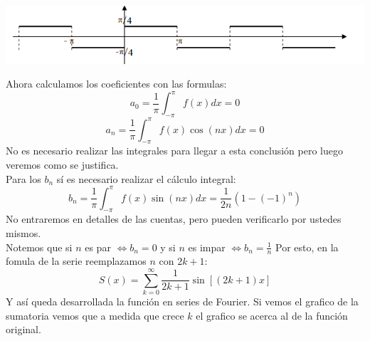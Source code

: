 \documentclass[]{article}
\begin{document}
\includegraphics{../../../Imagenes/Superior/Fourier/Fourier05.PNG}

Ahora calculamos los coeficientes con las formulas: 
$$
a_0 = \frac{1}{\pi} \int_{-\pi}^{\pi}f(x)dx = 0
$$
$$
a_n = \frac{1}{\pi} \int_{-\pi}^{\pi}f(x)\cos(nx)dx = 0
$$
No es necesario realizar las integrales para llegar a esta conclusión pero luego veremos como se justifica.\\
Para los $b_n$ sí es necesario realizar el cálculo integral:
$$
b_n = \frac{1}{\pi} \int_{-\pi}^{\pi}f(x)\sin(nx)dx = \frac{1}{2n}(1-(-1)^{n})
$$
No entraremos en detalles de las cuentas, pero pueden verificarlo por ustedes mismos.\\
Notemos que si $n$ es par $\Leftrightarrow b_n=0$ y si $n$ es impar $\Leftrightarrow b_n = \frac{1}{n}$ Por esto, en la fomula de la serie reemplazamos $n$ con $2k+1$:
$$
S(x) = \sum_{k=0}^{\infty}\frac{1}{2k+1}\sin[(2k+1)x]
$$
Y así queda desarrollada la función en series de Fourier. Si vemos el grafico de la sumatoria vemos que a medida que crece $k$ el grafico se acerca al de la función original.
\end{document}
